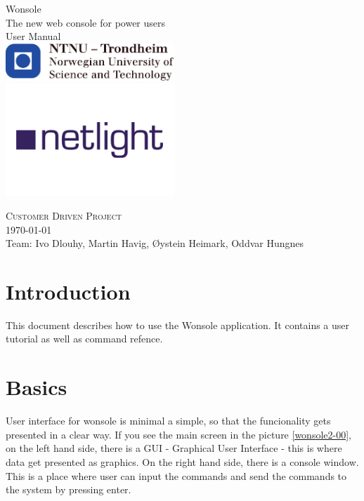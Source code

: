 \thispagestyle{empty}
\begin{center}
	{\Huge Wonsole} \\
	\medskip
	{\LARGE The new web console for power users} \\ 
	\bigskip
	{\Huge User Manual} \\ 
	\includegraphics[width=2.5in]{image/logo-ntnu.pdf} \\
	\includegraphics[width=2.5in]{image/logo-netlight.png}
\end{center}
{\Large \textsc{Customer Driven Project}} \\
{\large \today \\Team: Ivo Dlouhy, Martin Havig, Øystein Heimark, Oddvar Hungnes}
\newpage

\setcounter{tocdepth}{1}
\tableofcontents
\clearpage
\listoffigures


\chapter{Introduction}
This document describes how to use the Wonsole application. It contains a user
tutorial as well as command refence.

\chapter{Basics}
User interface for wonsole is minimal a simple, so that the funcionality gets
presented in a clear way. If you see the main screen in the
picture \ref{wonsole2-00}, on the left hand side, there is a GUI - Graphical
User Interface - this is where data get presented as graphics. On the right hand side, there is a console window. This is a place
where user can input the commands and send the commands to the system by
pressing enter.

